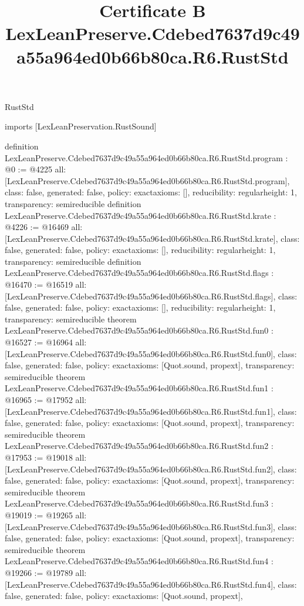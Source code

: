 \begin{lexlean}{RustStd}
\title{Certificate B LexLeanPreserve.Cdebed7637d9c49a55a964ed0b66b80ca.R6.RustStd}
\begin{coremodule}
imports [LexLeanPreservation.RustSound]

definition LexLeanPreserve.Cdebed7637d9c49a55a964ed0b66b80ca.R6.RustStd.program : @0 := @4225 {
  all: [LexLeanPreserve.Cdebed7637d9c49a55a964ed0b66b80ca.R6.RustStd.program],
  class: false,
  generated: false,
  policy: exact{axioms: []},
  reducibility: regular{height: 1},
  transparency: semireducible
}
definition LexLeanPreserve.Cdebed7637d9c49a55a964ed0b66b80ca.R6.RustStd.krate : @4226 := @16469 {
  all: [LexLeanPreserve.Cdebed7637d9c49a55a964ed0b66b80ca.R6.RustStd.krate],
  class: false,
  generated: false,
  policy: exact{axioms: []},
  reducibility: regular{height: 1},
  transparency: semireducible
}
definition LexLeanPreserve.Cdebed7637d9c49a55a964ed0b66b80ca.R6.RustStd.flags : @16470 := @16519 {
  all: [LexLeanPreserve.Cdebed7637d9c49a55a964ed0b66b80ca.R6.RustStd.flags],
  class: false,
  generated: false,
  policy: exact{axioms: []},
  reducibility: regular{height: 1},
  transparency: semireducible
}
theorem LexLeanPreserve.Cdebed7637d9c49a55a964ed0b66b80ca.R6.RustStd.fun0 : @16527 := @16964 {
  all: [LexLeanPreserve.Cdebed7637d9c49a55a964ed0b66b80ca.R6.RustStd.fun0],
  class: false,
  generated: false,
  policy: exact{axioms: [Quot.sound, propext]},
  transparency: semireducible
}
theorem LexLeanPreserve.Cdebed7637d9c49a55a964ed0b66b80ca.R6.RustStd.fun1 : @16965 := @17952 {
  all: [LexLeanPreserve.Cdebed7637d9c49a55a964ed0b66b80ca.R6.RustStd.fun1],
  class: false,
  generated: false,
  policy: exact{axioms: [Quot.sound, propext]},
  transparency: semireducible
}
theorem LexLeanPreserve.Cdebed7637d9c49a55a964ed0b66b80ca.R6.RustStd.fun2 : @17953 := @19018 {
  all: [LexLeanPreserve.Cdebed7637d9c49a55a964ed0b66b80ca.R6.RustStd.fun2],
  class: false,
  generated: false,
  policy: exact{axioms: [Quot.sound, propext]},
  transparency: semireducible
}
theorem LexLeanPreserve.Cdebed7637d9c49a55a964ed0b66b80ca.R6.RustStd.fun3 : @19019 := @19265 {
  all: [LexLeanPreserve.Cdebed7637d9c49a55a964ed0b66b80ca.R6.RustStd.fun3],
  class: false,
  generated: false,
  policy: exact{axioms: [Quot.sound, propext]},
  transparency: semireducible
}
theorem LexLeanPreserve.Cdebed7637d9c49a55a964ed0b66b80ca.R6.RustStd.fun4 : @19266 := @19789 {
  all: [LexLeanPreserve.Cdebed7637d9c49a55a964ed0b66b80ca.R6.RustStd.fun4],
  class: false,
  generated: false,
  policy: exact{axioms: [Quot.sound, propext]},
}
\end{coremodule}
\end{lexlean}
